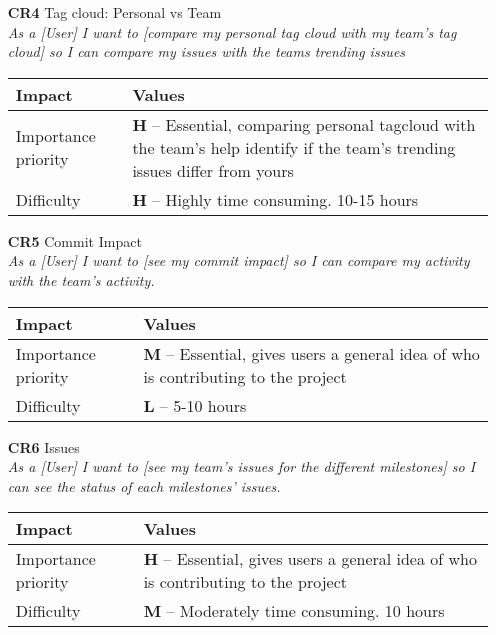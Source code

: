 \begin{itemize}
    \item[\textbf{CR4}] Tag cloud: Personal vs Team\\
        \textit{\small{As a [User] I want to [compare my personal tag cloud with my team's tag cloud] so I can compare my issues with the teams trending issues}}

        \begin{tabular}{| l | p{8cm} |}
            \hline
            \rowcolor[gray]{0.8}
            \textbf{Impact} & \textbf{Values} \\
            \hline
            Importance priority & \textbf{H} -- Essential, comparing personal tagcloud with the team's help identify if the team's trending issues differ from yours\\
            Difficulty & \textbf{H} -- Highly time consuming. 10-15 hours\\
            \hline
        \end{tabular}
    \vspace{0.5cm}

    \item[\textbf{CR5}] Commit Impact\\
        \textit{\small{As a [User] I want to [see my commit impact] so I can compare my activity with the team's activity.}}

        \begin{tabular}{| l | p{8cm} |}
            \hline
            \rowcolor[gray]{0.8}
            \textbf{Impact} & \textbf{Values} \\
            \hline
            Importance priority & \textbf{M} -- Essential, gives users a general idea of who is contributing to the project\\
            Difficulty & \textbf{L} -- 5-10 hours\\
            \hline
        \end{tabular}
    \vspace{0.5cm}

    \item[\textbf{CR6}] Issues\\
        \textit{\small{As a [User] I want to [see my team's issues for the different milestones] so I can see the status of each milestones' issues.}}

        \begin{tabular}{| l | p{8cm} |}
            \hline
            \rowcolor[gray]{0.8}
            \textbf{Impact} & \textbf{Values} \\
            \hline
            Importance priority & \textbf{H} -- Essential, gives users a general idea of who is contributing to the project\\
            Difficulty & \textbf{M} -- Moderately time consuming. 10 hours\\
            \hline
        \end{tabular}
    \vspace{0.5cm}


\end{itemize}
